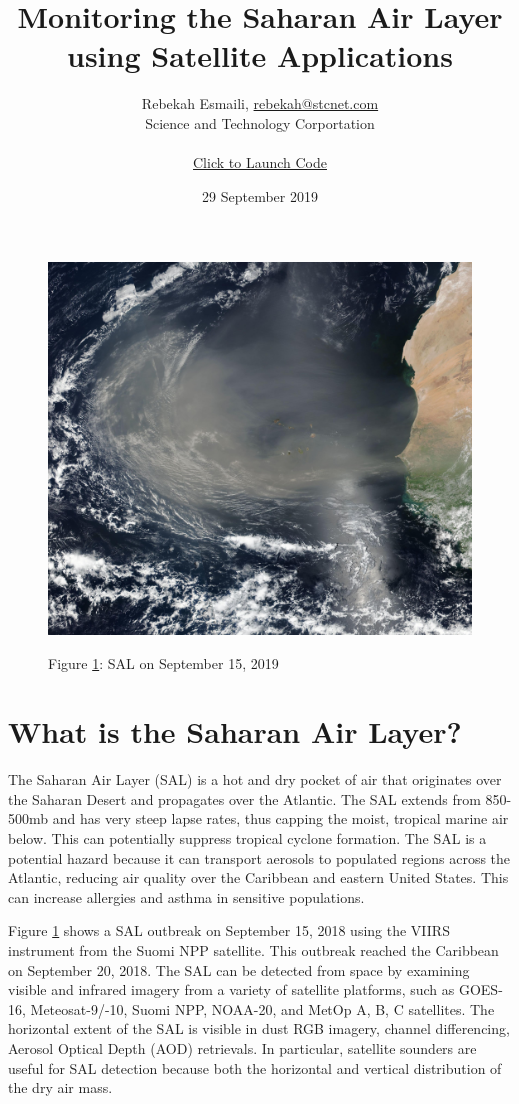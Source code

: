 \documentclass[11pt]{article}
\title{Monitoring the Saharan Air Layer using Satellite Applications}
\author{Rebekah Esmaili, \href{mailto:rebekah@stcnet.com}{rebekah@stcnet.com}
    \\ Science and Technology Corportation \\ \\ \href{https://mybinder.org/v2/gh/resmaili/nucaps-sal/master} {Click to Launch Code} }
\date{29 September 2019}
\makeatletter
\def\maxwidth{\ifdim\Gin@nat@width>\linewidth\linewidth
    \else\Gin@nat@width\fi}
\let\Oldincludegraphics\includegraphics
\renewcommand{\includegraphics}[1]{\Oldincludegraphics[width=.8\maxwidth]{#1}}
\makeatother
\begin{document}
    \maketitle


\begin{figure}
\centering
\includegraphics{images/SAL.jpeg}
\label{fig:sal}
\caption{Figure \ref{fig:sal}: SAL on September 15, 2019}
\end{figure}

\section{What is the Saharan Air
Layer?}\label{what-is-the-saharan-air-layer}

The Saharan Air Layer (SAL) is a hot and dry pocket of air that
originates over the Saharan Desert and propagates over the Atlantic. The
SAL extends from 850-500mb and has very steep lapse rates, thus capping
the moist, tropical marine air below. This can potentially suppress tropical
cyclone formation. The SAL is a potential hazard because it can
transport aerosols to populated regions across the Atlantic, reducing
air quality over the Caribbean and eastern United States. This can increase allergies and asthma in sensitive populations.


Figure \ref{fig:sal} shows a SAL outbreak on September 15, 2018 using the VIIRS
instrument from the Suomi NPP satellite. This outbreak reached the
Caribbean on September 20, 2018. The SAL can be detected from space by examining visible and infrared imagery from a variety of satellite platforms, such as GOES-16, Meteosat-9/-10, Suomi NPP, NOAA-20, and MetOp A, B, C satellites. The horizontal extent of the SAL is visible in dust RGB imagery, channel differencing, Aerosol Optical Depth (AOD) retrievals. In particular, satellite sounders are useful for SAL detection because both the horizontal and vertical distribution of the dry air mass.
\end{document}
